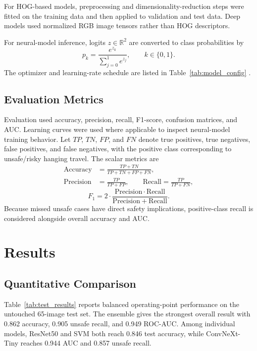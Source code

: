\documentclass[conference]{IEEEtran}
\begin{document}
For HOG-based models, preprocessing and dimensionality-reduction steps were fitted on the training data and then applied to validation and test data. Deep models used normalized RGB image tensors rather than HOG descriptors.

For neural-model inference, logits $z \in \mathbb{R}^{2}$ are converted to class probabilities by
\[
p_k = \frac{e^{z_k}}{\sum_{j=0}^{1} e^{z_j}}, \qquad k \in \{0, 1\}.
\]
The optimizer and learning-rate schedule are listed in Table~\ref{tab:model_config} \cite{kingma2015adam}.

\subsection{Evaluation Metrics}
Evaluation used accuracy, precision, recall, F1-score, confusion matrices, and AUC. Learning curves were used where applicable to inspect neural-model training behavior. Let $TP$, $TN$, $FP$, and $FN$ denote true positives, true negatives, false positives, and false negatives, with the positive class corresponding to unsafe/risky hanging travel. The scalar metrics are
\begin{align*}
\mathrm{Accuracy} & = \frac{TP + TN}{TP + TN + FP + FN}, \\
\mathrm{Precision} & = \frac{TP}{TP + FP}, \qquad
\mathrm{Recall} = \frac{TP}{TP + FN},
\end{align*}
\[
F_1 = 2 \cdot \frac{\mathrm{Precision} \cdot \mathrm{Recall}}{\mathrm{Precision} + \mathrm{Recall}}.
\]
Because missed unsafe cases have direct safety implications, positive-class recall is considered alongside overall accuracy and AUC.


\section{Results}
\subsection{Quantitative Comparison}
Table~\ref{tab:test_results} reports balanced operating-point performance on the untouched 65-image test set. The ensemble gives the strongest overall result with 0.862 accuracy, 0.905 unsafe recall, and 0.949 ROC-AUC. Among individual models, ResNet50 and SVM both reach 0.846 test accuracy, while ConvNeXt-Tiny reaches 0.944 AUC and 0.857 unsafe recall.
\end{document}

